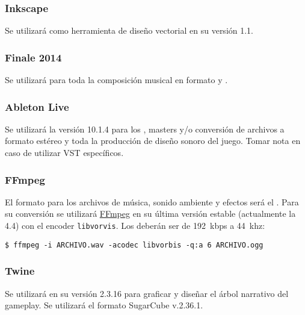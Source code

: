 \subsubsection{Inkscape}
Se utilizará como herramienta de diseño vectorial en su versión 1.1.

\subsubsection{Finale 2014}
Se utilizará para toda la composición musical en formato  y .

\subsubsection{Ableton Live}
Se utilizará la versión 10.1.4 para los , masters y/o conversión de archivos  a formato  estéreo y toda la producción de diseño sonoro del juego. Tomar nota en caso de utilizar VST específicos.

\subsubsection{FFmpeg}
El formato para los archivos de música, sonido ambiente y efectos será el . Para su conversión se utilizará \href{http://ffmpeg.org/}{FFmpeg} en su última versión estable (actualmente la 4.4) con el encoder \texttt{libvorvis}. Los  deberán ser de 192~kbps a 44~khz:
\lstset{style=bash}
\begin{lstlisting}
$ ffmpeg -i ARCHIVO.wav -acodec libvorbis -q:a 6 ARCHIVO.ogg
\end{lstlisting}

\subsubsection{Twine}
Se utilizará en su versión 2.3.16 para graficar y diseñar el árbol narrativo del gameplay. Se utilizará el formato SugarCube v.2.36.1.

